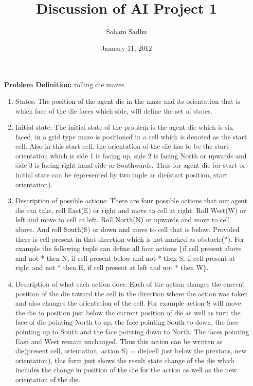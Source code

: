 \documentclass[12pt]{article}
\begin{document}
\title{ Discussion of AI Project 1 }
\author{ Soham Sadhu }
\date{ January 11, 2012 }
\maketitle

{\bf Problem Definition:} rolling die mazes.
\begin{enumerate}
	\item States: The position of the agent die in the maze and its orientation that is which face of the die faces which side, will define the set of states. 
	\item Initial state: The initial state of the problem is the agent die which is six faced, in a grid type maze is positioned in a cell which is denoted as the start cell. Also in this start cell, the orientation of the die has to be the start orientation which is side 1 is facing up, side 2 is facing North or upwards and side 3 is facing right hand side or Southwards. Thus for agent die for start or initial state can be represented by two tuple as die(start position, start orientation).
	\item Description of possible actions: There are four possible actions that our agent die can take, roll East(E) or right and move to cell at right. Roll West(W) or left and move to cell at left. Roll North(N) or upwards and move to cell above. And roll South(S) or down and move to cell that is below. Provided there is cell present in that direction which is not marked as obstacle(*). For example the following tuple can define all four actions \{if cell present above and not * then N, if cell present below and not * then S, if cell present at right and not * then E, if cell present at left and not * then W\}.
	\item Description of what each action does: Each of the action changes the current position of the die toward the cell in the direction where the action was taken and also changes the orientation of the cell. For example action S will move the die to position just below the current position of die as well as turn the face of die pointing North to up, the face pointing South to down, the face pointing up to South and the face pointing down to North. The faces pointing East and West remain unchanged. Thus this action can be written as die(present cell, orientation, action S) = die(cell just below the previous, new orientation), this form just shows the result state change of the die which includes the change in position of the die for the action as well as the new orientation of the die.

\end{enumerate}
\end{document}
